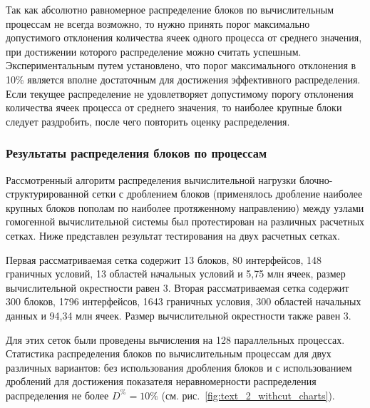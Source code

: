 Так как абсолютно равномерное распределение блоков по вычислительным процессам не всегда возможно, то нужно принять порог максимально допустимого отклонения количества ячеек одного процесса от среднего значения, при достижении которого распределение можно считать успешным.
Экспериментальным путем установлено, что порог максимального отклонения в 10\% является вполне достаточным для достижения эффективного распределения.
Если текущее распределение не удовлетворяет допустимому порогу отклонения количества ячеек процесса от среднего значения, то наиболее крупные блоки следует раздробить, после чего повторить оценку распределения.

\subsubsection{Результаты распределения блоков по процессам}

Рассмотренный алгоритм распределения вычислительной нагрузки блочно-структурированной сетки с дроблением блоков (применялось дробление наиболее крупных блоков пополам по наиболее протяженному направлению) между узлами гомогенной вычислительной системы был протестирован на различных расчетных сетках.
Ниже представлен результат тестирования на двух расчетных сетках.

Первая рассматриваемая сетка содержит 13 блоков, 80 интерфейсов, 148 граничных условий, 13 областей начальных условий и 5,75 млн ячеек, размер вычислительной окрестности равен 3.
Вторая рассматриваемая сетка содержит 300 блоков, 1796 интерфейсов, 1643 граничных условия, 300 областей начальных данных и 94,34 млн ячеек.
Размер вычислительной окрестности также равен 3.

Для этих сеток были проведены вычисления на 128 параллельных процессах.
Статистика распределения блоков по вычислительным процессам для двух различных вариантов: без использования дробления блоков и с использованием дроблений для достижения показателя неравномерности распределения распределения не более $D^{\%} = 10\%$ (см. рис.~\ref{fig:text_2_withcut_charts}).

